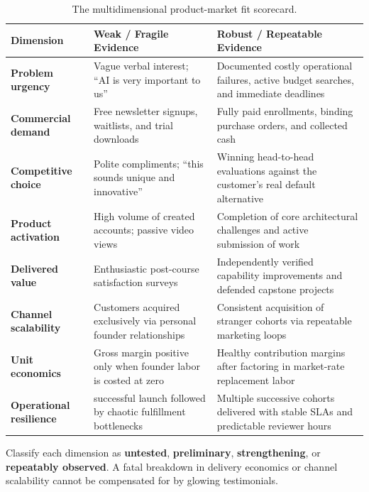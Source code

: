 \begin{table}[t]
\centering
\small
\begin{tabularx}{\textwidth}{>{\raggedright\arraybackslash}p{3cm} >{\raggedright\arraybackslash}X >{\raggedright\arraybackslash}X}
\toprule
\textbf{Dimension} & \textbf{Weak / Fragile Evidence} & \textbf{Robust / Repeatable Evidence} \\
\midrule
\textbf{Problem urgency} & Vague verbal interest; ``AI is very important to us'' & Documented costly operational failures, active budget searches, and immediate deadlines \\
\textbf{Commercial demand} & Free newsletter signups, waitlists, and trial downloads & Fully paid enrollments, binding purchase orders, and collected cash \\
\textbf{Competitive choice} & Polite compliments; ``this sounds unique and innovative'' & Winning head-to-head evaluations against the customer's real default alternative \\
\textbf{Product activation} & High volume of created accounts; passive video views & Completion of core architectural challenges and active submission of work \\
\textbf{Delivered value} & Enthusiastic post-course satisfaction surveys & Independently verified capability improvements and defended capstone projects \\
\textbf{Channel scalability} & Customers acquired exclusively via personal founder relationships & Consistent acquisition of stranger cohorts via repeatable marketing loops \\
\textbf{Unit economics} & Gross margin positive only when founder labor is costed at zero & Healthy contribution margins after factoring in market-rate replacement labor \\
\textbf{Operational resilience} & 1 successful launch followed by chaotic fulfillment bottlenecks & Multiple successive cohorts delivered with stable SLAs and predictable reviewer hours \\
\bottomrule
\end{tabularx}
\caption{The multidimensional product-market fit scorecard.}
\label{tab:ch9-pmf-scorecard}
\end{table}

Classify each dimension as \textbf{untested}, \textbf{preliminary}, \textbf{strengthening}, or \textbf{repeatably observed}. A fatal breakdown in delivery economics or channel scalability cannot be compensated for by glowing testimonials.

